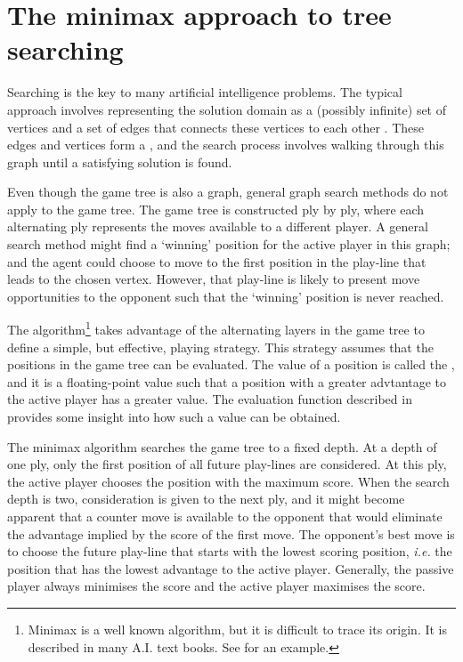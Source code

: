 \section{The minimax approach to tree searching}
\label{sec:tree-minimax}
Searching is the key to many artificial intelligence problems. The typical approach involves representing the solution domain as a (possibly infinite) set of vertices and a set of edges that connects  these vertices to each other \cite{poole98,nilsson:principles}.  These edges and vertices form a , and the search process involves walking through this graph until a satisfying solution is found.  

Even though the game tree is also a graph, general graph search methods do not apply to the game tree. The game tree is constructed ply by ply, where each alternating ply represents the moves available to a different player.  A general search method might find a `winning' position for the active player in this graph; and the agent could choose to move to the first position in the play-line that leads to the chosen vertex. However, that  play-line is likely to present move opportunities to the opponent such that the `winning' position is never reached. 

The  algorithm\footnote{Minimax is a well known algorithm, but it is difficult to trace its origin.  It is described in many A.I. text books. See \cite{rich83} for an example.} takes advantage of the alternating layers in the game tree to define a simple, but effective, playing strategy. This strategy assumes that the positions in the game tree can be evaluated.  The value of a position is called the , and it is a floating-point value such that a position with a greater advtantage to the active player has a greater value. The evaluation function described in  provides some insight into how such a value can be obtained.

The minimax algorithm searches the game tree to a fixed depth. At a depth of one ply, only the  first position of all future play-lines are considered.  At this ply, the active player chooses the position with the maximum score. When the search depth is two, consideration is given to the next ply, and it might become apparent that a counter move is available to the opponent that would eliminate the advantage implied by the score of the first move. The opponent's best move is to choose the future play-line that starts with the lowest scoring position, {\it i.e.} the position that has the lowest advantage to the active player.  Generally, the passive player always minimises the score and the active player maximises the score. 

